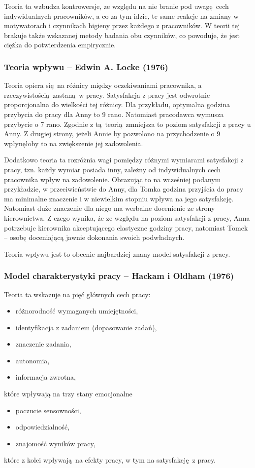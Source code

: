 Teoria ta wzbudza kontrowersje, ze względu na nie branie pod uwagę cech indywidualnych pracowników, a co za tym idzie, te same reakcje na zmiany w motywatorach i czynnikach higieny przez każdego z pracowników. W teorii tej brakuje także wskazanej metody badania obu czynników, co powoduje, że jest ciężka do potwierdzenia empirycznie.


\subsubsection{Teoria wpływu -- Edwin A. Locke (1976)}
\label{sec:theory-sat-locke}

Teoria \citep{locke1976nature} opiera się na różnicy między oczekiwaniami pracownika, a rzeczywistością zastaną w pracy. Satysfakcja z pracy jest odwrotnie proporcjonalna do wielkości tej różnicy. Dla przykładu, optymalna godzina przybycia do pracy dla Anny to 9 rano. Natomiast pracodawca wymusza przybycie o 7 rano. Zgodnie z tą teorią zmniejsza to poziom satysfakcji z pracy u Anny. Z drugiej strony, jeżeli Annie by pozwolono na przychodzenie o 9 wpłynęłoby to na zwiększenie jej zadowolenia.

Dodatkowo teoria ta rozróżnia wagi pomiędzy różnymi wymiarami satysfakcji z pracy, tzn. każdy wymiar posiada inny, zależny od indywidualnych cech pracownika wpływ na zadowolenie. Obrazując to na wcześniej podanym przykładzie, w przeciwieństwie do Anny, dla Tomka godzina przyjścia do pracy ma minimalne znaczenie i w niewielkim stopniu wpływa na jego satysfakcję. Natomiast duże znaczenie dla niego ma werbalne docenienie ze strony kierownictwa. Z czego
wynika, że ze względu na poziom satysfakcji z pracy, Anna potrzebuje kierownika akceptującego elastyczne godziny pracy, natomiast Tomek -- osobę doceniającą jawnie dokonania swoich podwładnych.

Teoria wpływu jest to obecnie najbardziej znany model satysfakcji z pracy.

\subsubsection{Model charakterystyki pracy -- Hackam i Oldham (1976)}
Teoria ta \citep{hackman1976motivation} wskazuje na pięć głównych cech pracy:
\begin{itemize}
\item różnorodność wymaganych umiejętności,
\item identyfikacja z zadaniem (dopasowanie zadań),
\item znaczenie zadania,
\item autonomia,
\item informacja zwrotna,
\end{itemize}
które wpływają na trzy stany emocjonalne
\begin{itemize}
\item poczucie sensowności,
\item odpowiedzialność,
\item znajomość wyników pracy,
\end{itemize}
które z kolei wpływają na efekty pracy, w tym na satysfakcję z pracy. 


